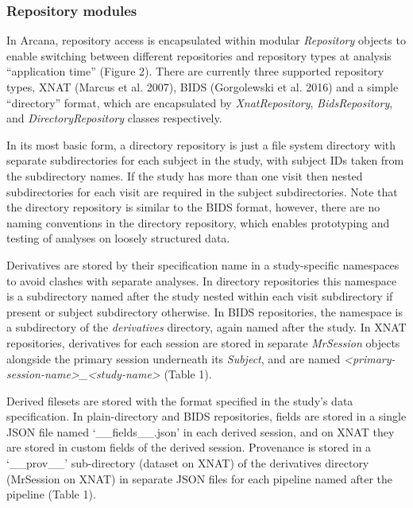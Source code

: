 \hypertarget{repository-modules}{%
\subsubsection{Repository modules}\label{repository-modules}}

In Arcana, repository access is encapsulated within modular
\emph{Repository} objects to enable switching between different
repositories and repository types at analysis ``application time''
(Figure 2). There are currently three supported repository types, XNAT
(Marcus et al. 2007), BIDS (Gorgolewski et al. 2016) and a simple
``directory'' format, which are encapsulated by \emph{XnatRepository},
\emph{BidsRepository}, and \emph{DirectoryRepository} classes
respectively.

In its most basic form, a directory repository is just a file system
directory with separate subdirectories for each subject in the study,
with subject IDs taken from the subdirectory names. If the study has
more than one visit then nested subdirectories for each visit are
required in the subject subdirectories. Note that the directory
repository is similar to the BIDS format, however, there are no naming
conventions in the directory repository, which enables prototyping and
testing of analyses on loosely structured data.

Derivatives are stored by their specification name in a study-specific
namespaces to avoid clashes with separate analyses. In directory
repositories this namespace is a subdirectory named after the study
nested within each visit subdirectory if present or subject subdirectory
otherwise. In BIDS repositories, the namespace is a subdirectory of the
\emph{derivatives} directory, again named after the study. In XNAT
repositories, derivatives for each session are stored in separate
\emph{MrSession} objects alongside the primary session underneath its
\emph{Subject}, and are named
\emph{\textless{}primary-session-name\textgreater{}\_\textless{}study-name\textgreater{}}
(Table 1).

Derived filesets are stored with the format specified in the study's
data specification. In plain-directory and BIDS repositories, fields are
stored in a single JSON file named `\_\_fields\_\_.json' in each derived
session, and on XNAT they are stored in custom fields of the derived
session. Provenance is stored in a `\_\_prov\_\_' sub-directory (dataset
on XNAT) of the derivatives directory (MrSession on XNAT) in separate
JSON files for each pipeline named after the pipeline (Table 1).

